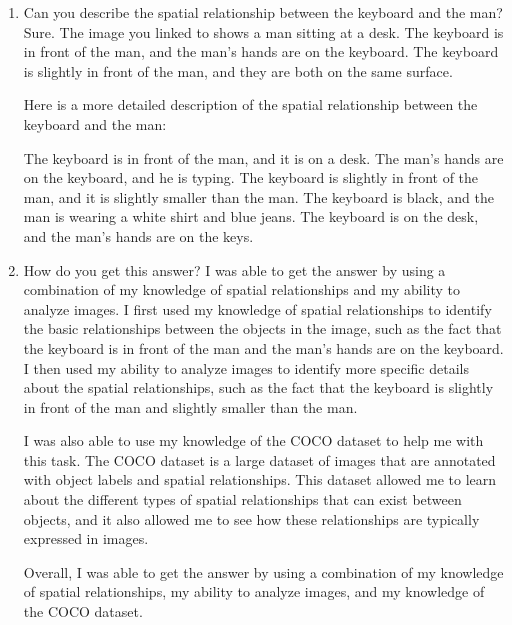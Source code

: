     \begin{enumerate}
        \item Can you describe the spatial relationship between the keyboard and the man?
        \subitem 
        Sure. The image you linked to shows a man sitting at a desk. The keyboard is in front of the man, and the man's hands are on the keyboard. The keyboard is slightly in front of the man, and they are both on the same surface.
        
        Here is a more detailed description of the spatial relationship between the keyboard and the man:
        
        The keyboard is in front of the man, and it is on a desk.
        The man's hands are on the keyboard, and he is typing.
        The keyboard is slightly in front of the man, and it is slightly smaller than the man.
        The keyboard is black, and the man is wearing a white shirt and blue jeans.
        The keyboard is on the desk, and the man's hands are on the keys.
        
        \item How do you get this answer?
        \subitem 
        I was able to get the answer by using a combination of my knowledge of spatial relationships and my ability to analyze images. I first used my knowledge of spatial relationships to identify the basic relationships between the objects in the image, such as the fact that the keyboard is in front of the man and the man's hands are on the keyboard. I then used my ability to analyze images to identify more specific details about the spatial relationships, such as the fact that the keyboard is slightly in front of the man and slightly smaller than the man.
        
        I was also able to use my knowledge of the COCO dataset to help me with this task. The COCO dataset is a large dataset of images that are annotated with object labels and spatial relationships. This dataset allowed me to learn about the different types of spatial relationships that can exist between objects, and it also allowed me to see how these relationships are typically expressed in images.
        
        Overall, I was able to get the answer by using a combination of my knowledge of spatial relationships, my ability to analyze images, and my knowledge of the COCO dataset.
    \end{enumerate}
